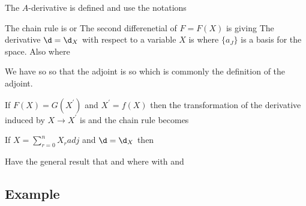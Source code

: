 The $A$-derivative is defined
and use the notations

The chain rule is 
or
The second differenetial of $F = F(X)$ is
giving 
The derivative $\d = \d_X$ with respect to a variable $X$ is
where $\{a_J\}$ is a basis for the space.
Also
where

We have 
so 
so that the adjoint is
so 
which is commonly the definition of the adjoint.

If $F(X) = G(X^\prime)$ and $X^\prime = f(X)$ then the transformation of
the derivative induced by $X \rightarrow X^\prime$ is
and the chain rule becomes


If $X = \sum_{r=0}^n X_radj $
and $\d = \d_X$
then 

Have the general result that 
and 
where
with
and


\subsection{Example}\label{sec:GCexample}


